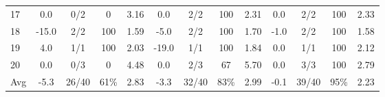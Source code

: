 \begin{table}[p]
{\begin{tabular}{l|cccc|cccc|cccc}
17 & 0.0 & 0/2 & 0 & 3.16 & 0.0 & 2/2 & 100 & 2.31 & 0.0 & 2/2 & 100 & 2.33 \\
18 & -15.0 & 2/2 & 100 & 1.59 & -5.0 & 2/2 & 100 & 1.70 & -1.0 & 2/2 & 100 & 1.58 \\
19 & 4.0 & 1/1 & 100 & 2.03 & -19.0 & 1/1 & 100 & 1.84 & 0.0 & 1/1 & 100 & 2.12 \\
20 & 0.0 & 0/3 & 0 & 4.48 & 0.0 & 2/3 & 67 & 5.70 & 0.0 & 3/3 & 100 & 2.79 \\
\midrule
Avg & -5.3 & 26/40 & 61\% & 2.83 & -3.3 & 32/40 & 83\% & 2.99 & -0.1 & 39/40 & 95\% & 2.23 \\
\bottomrule
\end{tabular}%
}
\end{table}
